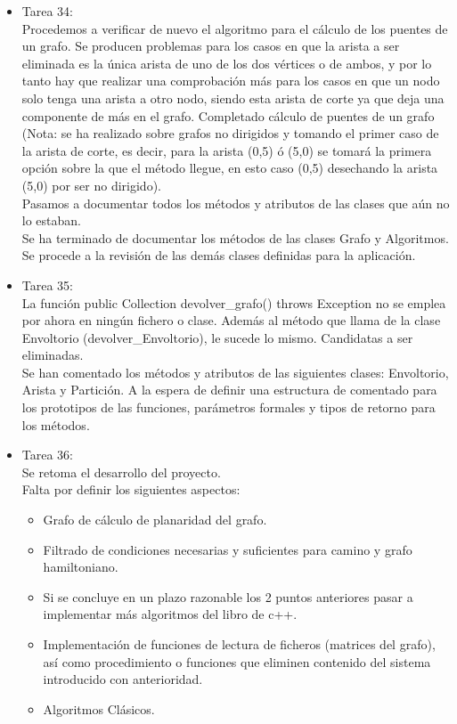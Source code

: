 \begin{itemize}
\item Tarea 34:\\
Procedemos a verificar de nuevo el algoritmo para el cálculo de los puentes de un grafo. Se producen problemas para los casos en que la arista a ser eliminada es la única arista de uno de los dos vértices o de ambos, y por lo tanto hay que realizar una comprobación más para los casos en que un nodo solo tenga una arista a otro nodo, siendo esta arista de corte ya que deja una componente de más en el grafo. Completado cálculo de puentes de un grafo (Nota: se ha realizado sobre grafos no dirigidos y tomando el primer caso de la arista de corte, es decir, para la arista (0,5) ó (5,0) se tomará la primera opción sobre la que el método llegue, en esto caso (0,5) desechando la arista (5,0) por ser no dirigido).\\

Pasamos a documentar todos los métodos y atributos de las clases que aún no lo estaban.\\

Se ha terminado de documentar los métodos de las clases Grafo y Algoritmos. Se procede a la revisión de las demás clases definidas para la aplicación.\\

\item Tarea 35:\\
La función public Collection devolver\_grafo() throws Exception no se emplea por ahora en ningún fichero o clase. Además al método que llama de la clase Envoltorio (devolver\_Envoltorio), le sucede lo mismo. Candidatas a ser eliminadas.\\

Se han comentado los métodos y atributos de las siguientes clases: Envoltorio, Arista y Partición. A la espera de definir una estructura de comentado para los prototipos de las funciones, parámetros formales y tipos de retorno para los métodos.\\

\item Tarea 36:\\
Se retoma el desarrollo del proyecto.\\

Falta por definir los siguientes aspectos:\\
\begin{itemize}
\item Grafo de cálculo de planaridad del grafo.
\item Filtrado de condiciones necesarias y suficientes para camino y grafo hamiltoniano.
\item Si se concluye en un plazo razonable los 2 puntos anteriores pasar a implementar más algoritmos del libro de c++.
\item Implementación de funciones de lectura de ficheros (matrices del grafo), así como procedimiento o funciones que eliminen contenido del sistema introducido con anterioridad.
\item Algoritmos Clásicos.
\end{itemize}


\end{itemize}
